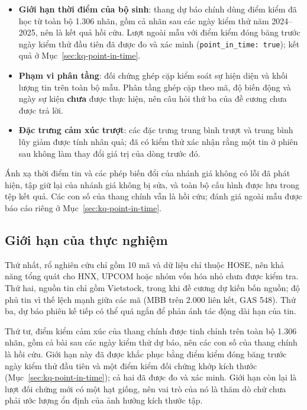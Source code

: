 \begin{itemize}[nosep]
        tách nên chưa thể kết luận về ảnh hưởng của mật độ tin.
  \item \textbf{Giới hạn thời điểm của bộ sinh}: thang dự báo chính dùng điểm kiểm đã học
        từ toàn bộ 1.306 nhãn, gồm cả nhãn sau các ngày kiểm thử năm 2024--2025, nên là
        kết quả hồi cứu. Lượt ngoài mẫu với điểm kiểm đóng băng trước ngày kiểm thử đầu
        tiên đã được đo và xác minh (\texttt{point\_in\_time: true}); kết quả ở
        Mục~\ref{sec:kq-point-in-time}.
  \item \textbf{Phạm vi phân tầng}: đối chứng ghép cặp kiểm soát sự hiện diện và khối lượng
        tin trên toàn bộ mẫu. Phân tầng ghép cặp theo mã, độ biến động và ngày sự kiện
        \textbf{chưa} được thực hiện, nên câu hỏi thứ ba của đề cương chưa được trả lời.
  \item \textbf{Đặc trưng cảm xúc trượt}: các đặc trưng trung bình trượt và trung bình lũy
        giảm được tính nhân quả; đã có kiểm thử xác nhận rằng một tin ở phiên sau không làm
        thay đổi giá trị của dòng trước đó.
\end{itemize}

Ánh xạ thời điểm tin và các phép biến đổi của nhánh giá không có lỗi đã phát hiện, tập giữ
lại của nhánh giá không bị sửa, và toàn bộ cấu hình được lưu trong tệp kết quả. Các con số
của thang chính vẫn là hồi cứu; đánh giá ngoài mẫu được báo cáo riêng ở
Mục~\ref{sec:kq-point-in-time}.

\subsection{Giới hạn của thực nghiệm}
\label{sec:kq-limitations}

Thứ nhất, rổ nghiên cứu chỉ gồm 10 mã và dữ liệu chỉ thuộc HOSE, nên khả năng tổng quát
cho HNX, UPCOM hoặc nhóm vốn hóa nhỏ chưa được kiểm tra. Thứ hai, nguồn tin chỉ gồm
Vietstock, trong khi đề cương dự kiến bốn nguồn; độ phủ tin vì thế lệch mạnh giữa các mã
(MBB trên 2.000 liên kết, GAS 548). Thứ ba, dự báo phiên kế tiếp có thể quá ngắn để phản
ánh tác động dài hạn của tin.

Thứ tư, điểm kiểm cảm xúc của thang chính được tinh chỉnh trên toàn bộ 1.306 nhãn,
gồm cả bài sau các ngày kiểm thử dự báo, nên các con số của thang chính là hồi cứu.
Giới hạn này đã được khắc phục bằng điểm kiểm đóng băng trước ngày kiểm thử đầu tiên
và một điểm kiểm đối chứng khớp kích thước (Mục~\ref{sec:kq-point-in-time}); cả hai
đã được đo và xác minh. Giới hạn còn lại là lượt đối chứng mới có một hạt giống, nên
vai trò của nó là thăm dò chứ chưa phải ước lượng ổn định của ảnh hưởng kích thước
tập.

